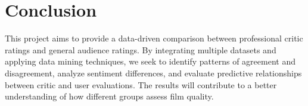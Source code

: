 \documentclass[conference]{IEEEtran}
\begin{document}
\section{Conclusion}

This project aims to provide a data-driven comparison between
professional critic ratings and general audience ratings. By
integrating multiple datasets and applying data mining techniques,
we seek to identify patterns of agreement and disagreement, analyze
sentiment differences, and evaluate predictive relationships between
critic and user evaluations. The results will contribute to a better
understanding of how different groups assess film quality.



\end{document}
